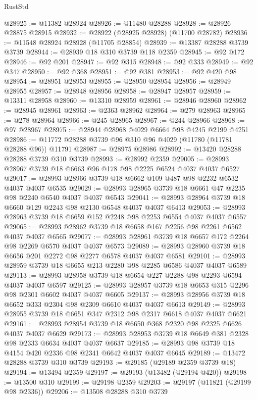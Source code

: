 \begin{lexlean}{RustStd}
\begin{coremodule}
@28925 := @11382 @28924
@28926 := @11480 @28288
@28928 := @28926 @28875 @28915
@28932 := @28922 (@28925 @28928) (@11700 @28782)
@28936 := @11548 @28924 @28928 (@11705 @28854)
@28939 := @13387 @28288 @3739 @3739
@28944 := @28939 @18 @310 @3739 @118 @2359
@28945 := @92 @172
@28946 := @92 @201
@28947 := @92 @315
@28948 := @92 @333
@28949 := @92 @347
@28950 := @92 @368
@28951 := @92 @381
@28953 := @92 @420 @98
@28954 := @28951 @28953
@28955 := @28950 @28954
@28956 := @28949 @28955
@28957 := @28948 @28956
@28958 := @28947 @28957
@28959 := @13311 @28958
@28960 := @13310 @28959
@28961 := @28946 @28960
@28962 := @28945 @28961
@28963 := @2363 @28962
@28964 := @279 @28963
@28965 := @278 @28964
@28966 := @245 @28965
@28967 := @244 @28966
@28968 := @97 @28967
@28975 := @28944 @28968 @4029 @6664 @98 @4245 @2199 @4251
@28986 := @11772 @28288 @3739 @96 @310 @96 @4029 (@11780 (@11781 @28288 @96)) @11791
@28987 := @28975 @28986
@28992 := @13420 @28288 @28288 @3739 @310 @3739
@28993 := @28992 @2359
@29005 := @28993 @28967 @3739 @18 @6663 @96 @178 @98 @2225 @6524 @4037 @4037 @6527
@29017 := @28993 @28966 @3739 @18 @6662 @109 @487 @98 @2232 @6532 @4037 @4037 @6535
@29029 := @28993 @28965 @3739 @18 @6661 @47 @2235 @98 @2240 @6540 @4037 @4037 @6543
@29041 := @28993 @28964 @3739 @18 @6660 @129 @2243 @98 @2130 @6548 @4037 @4037 @6413
@29053 := @28993 @28963 @3739 @18 @6659 @152 @2248 @98 @2253 @6554 @4037 @4037 @6557
@29065 := @28993 @28962 @3739 @18 @6658 @167 @2256 @98 @2261 @6562 @4037 @4037 @6565
@29077 := @28993 @28961 @3739 @18 @6657 @172 @2264 @98 @2269 @6570 @4037 @4037 @6573
@29089 := @28993 @28960 @3739 @18 @6656 @201 @2272 @98 @2277 @6578 @4037 @4037 @6581
@29101 := @28993 @28959 @3739 @18 @6655 @213 @2280 @98 @2285 @6586 @4037 @4037 @6589
@29113 := @28993 @28958 @3739 @18 @6654 @227 @2288 @98 @2293 @6594 @4037 @4037 @6597
@29125 := @28993 @28957 @3739 @18 @6653 @315 @2296 @98 @2301 @6602 @4037 @4037 @6605
@29137 := @28993 @28956 @3739 @18 @6652 @333 @2304 @98 @2309 @6610 @4037 @4037 @6613
@29149 := @28993 @28955 @3739 @18 @6651 @347 @2312 @98 @2317 @6618 @4037 @4037 @6621
@29161 := @28993 @28954 @3739 @18 @6650 @368 @2320 @98 @2325 @6626 @4037 @4037 @6629
@29173 := @28993 @28953 @3739 @18 @6649 @381 @2328 @98 @2333 @6634 @4037 @4037 @6637
@29185 := @28993 @98 @3739 @18 @4154 @420 @2336 @98 @2341 @6642 @4037 @4037 @6645
@29189 := @13472 @28288 @3739 @310 @3739
@29193 := @29185 (@29189 @2359 @3739 @18)
@29194 := @13494 @2359
@29197 := @29193 (@13482 (@29194 @420))
@29198 := @13500 @310
@29199 := @29198 @2359
@29203 := @29197 (@11821 (@29199 @98 @2336))
@29206 := @13508 @28288 @310 @3739

\end{coremodule}
\end{lexlean}
